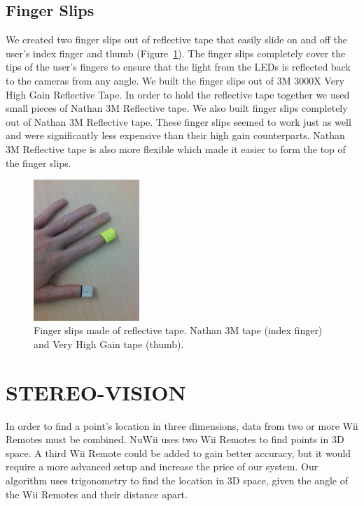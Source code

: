 \documentclass[a4paper,twoside]{article}
\begin{document}
\subsection{Finger Slips} We created two finger slips out of reflective tape
that easily slide on and off the user's index finger and thumb
(Figure~\ref{fingerslips}). The finger slips completely cover the tips of the
user's fingers to ensure that the light from the LEDs is reflected back to the
cameras from any angle. We built the finger slips out of 3M 3000X Very High
Gain Reflective Tape. In order to hold the reflective tape together we used
small pieces of Nathan 3M Reflective tape. We also built finger slips
completely out of Nathan 3M Reflective tape. These finger slips seemed to work
just as well and were significantly less expensive than their high gain
counterparts. Nathan 3M Reflective tape is also more flexible which made it
easier to form the top of the finger slips.  

\begin{figure}[h] \begin{center}
\includegraphics[width = 4cm]{fingerslips.png} \end{center} \caption{Finger
slips made of reflective tape.  Nathan 3M tape (index finger) and Very High
Gain tape (thumb).} \label{fingerslips} \end{figure}

\section{\uppercase{Stereo-Vision}}
\noindent In order to find a point's location in three dimensions, data from
two or more Wii Remotes must be combined. NuWii uses two Wii Remotes to find
points in 3D space. A third Wii Remote could be added to gain better accuracy,
but it would require a more advanced setup and increase the price of our
system. Our algorithm uses trigonometry to find the location in 3D space, given
the angle of the Wii Remotes and their distance apart.  
\end{document}
